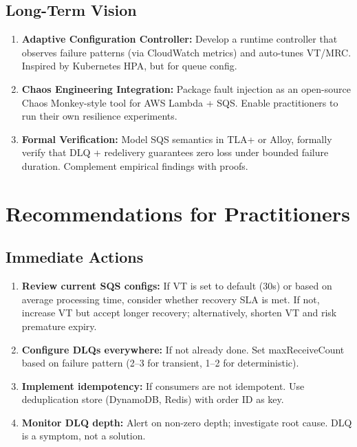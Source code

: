 \subsection{Long-Term Vision}

\begin{enumerate}
    \item \textbf{Adaptive Configuration Controller:} Develop a runtime controller that observes failure patterns (via CloudWatch metrics) and auto-tunes VT/MRC. Inspired by Kubernetes HPA, but for queue config.
    
    \item \textbf{Chaos Engineering Integration:} Package fault injection as an open-source Chaos Monkey-style tool for AWS Lambda + SQS. Enable practitioners to run their own resilience experiments.
    
    \item \textbf{Formal Verification:} Model SQS semantics in TLA+ or Alloy, formally verify that DLQ + redelivery guarantees zero loss under bounded failure duration. Complement empirical findings with proofs.
\end{enumerate}

\section{Recommendations for Practitioners}

\subsection{Immediate Actions}

\begin{enumerate}
    \item \textbf{Review current SQS configs:} If VT is set to default (30s) or based on average processing time, consider whether recovery SLA is met. If not, increase VT but accept longer recovery; alternatively, shorten VT and risk premature expiry.
    
    \item \textbf{Configure DLQs everywhere:} If not already done. Set maxReceiveCount based on failure pattern (2–3 for transient, 1–2 for deterministic).
    
    \item \textbf{Implement idempotency:} If consumers are not idempotent. Use deduplication store (DynamoDB, Redis) with order ID as key.
    
    \item \textbf{Monitor DLQ depth:} Alert on non-zero depth; investigate root cause. DLQ is a symptom, not a solution.
\end{enumerate}

